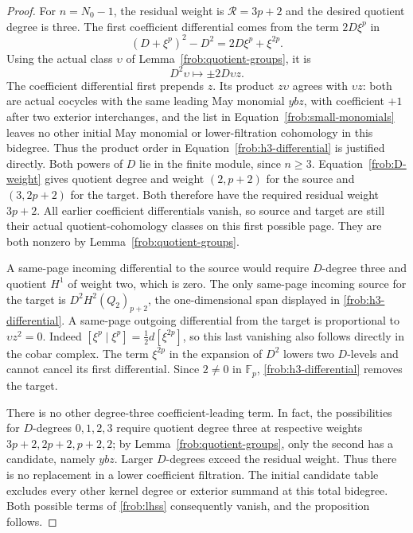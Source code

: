 \begin{proof}
For $n=N_0-1$, the residual weight is $\mathcal R=3p+2$ and the desired
quotient degree is three.  The first coefficient differential
comes from the term $2D\xi^p$ in
\[
 (D+\xi^p)^2-D^2=2D\xi^p+\xi^{2p}.
\]
Using the actual class $\upsilon$ of
Lemma~\ref{frob:quotient-groups}, it is
\begin{equation}\label{frob:h3-differential}
 D^2\upsilon\longmapsto\pm2D\upsilon z.
\end{equation}
The coefficient differential first prepends $z$. Its product
$z\upsilon$ agrees with $\upsilon z$: both are actual cocycles
with the same leading May monomial $ybz$, with coefficient $+1$
after two exterior interchanges, and the list in Equation~\eqref{frob:small-monomials}
leaves no other initial May monomial or lower-filtration cohomology
in this bidegree. Thus the product order in
Equation~\eqref{frob:h3-differential} is justified directly.
Both powers of $D$ lie in the finite module, since $n\geq3$.
Equation~\eqref{frob:D-weight} gives quotient degree and weight
$(2,p+2)$ for the source and $(3,2p+2)$ for the target.
Both therefore have the required residual weight $3p+2$.
All earlier coefficient differentials vanish, so source and target are
still their actual quotient-cohomology classes on this first possible
page.  They are both nonzero by
Lemma~\ref{frob:quotient-groups}.

A same-page incoming differential to the source would require
$D$-degree three and quotient $H^1$ of weight two,
which is zero.  The only same-page incoming source for the target
is $D^2H^2(Q_2)_{p+2}$, the one-dimensional span displayed in
\eqref{frob:h3-differential}.  A same-page outgoing differential
from the target is proportional to $\upsilon z^2=0$.
Indeed $[\xi^p\mid\xi^p]=\tfrac12d[\xi^{2p}]$, so this
last vanishing also follows directly in the cobar complex.
The term $\xi^{2p}$ in the expansion of $D^2$ lowers two
$D$-levels and cannot cancel its first differential.  Since
$2\neq0$ in $\mathbb F_p$, \eqref{frob:h3-differential}
removes the target.

There is no other degree-three coefficient-leading term.  In fact,
the possibilities for $D$-degrees $0,1,2,3$ require quotient
degree three at respective weights
$3p+2,2p+2,p+2,2$; by
Lemma~\ref{frob:quotient-groups}, only the second has a
candidate, namely $ybz$.  Larger $D$-degrees exceed the residual
weight.  Thus there is no replacement in a lower coefficient
filtration.  The initial candidate table excludes every other
kernel degree or exterior summand at this total bidegree.
Both possible terms of \eqref{frob:lhss} consequently vanish,
and the proposition follows.
\end{proof}

